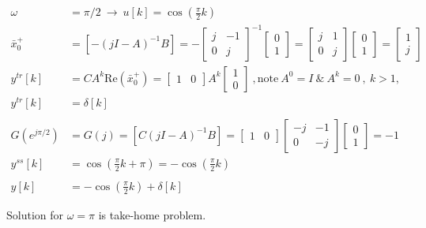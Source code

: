 \documentclass[twoside]{article}
\begin{document}
\begin{align*} 
	\omega &= \pi/2 \ \rightarrow \ u[k] = \cos \left( \frac{\pi}{2} k \right)
	\\
 	\bar{x}_0^+ &= \left[ - (j I - A)^{-1} B \right] = - \begin{bmatrix} j & -1 \\ 0 & j \end{bmatrix}^{-1} \begin{bmatrix} 0 \\ 1 \end{bmatrix} = 
	 \begin{bmatrix} j & 1 \\ 0 & j \end{bmatrix} \begin{bmatrix} 0 \\ 1 \end{bmatrix} = \begin{bmatrix} 1 \\ j \end{bmatrix} 
	 \\
	 y^{tr}[k] &= C A^k \mathrm{Re} \left( \bar{x}_0^+ \right) = \begin{bmatrix} 1 & 0 \end{bmatrix} A^k \begin{bmatrix} 1 \\ 0 \end{bmatrix} \ ,  \mathrm{note} \  A^0 = I \ \& \ A^k = 0 \ , \ k > 1 ,
	 \\
	 y^{tr}[k] &= \delta[k]
	 \\
	 \\
	 G(e^{j \pi/2 }) &= G(j) = \left[ C (j I - A)^{-1} B \right] = \begin{bmatrix} 1 & 0 \end{bmatrix} \begin{bmatrix} -j & -1 \\ 0 & -j \end{bmatrix} \begin{bmatrix} 0 \\ 1 \end{bmatrix} = -1
	 \\
	 y^{ss}[k] &= \cos\left( \frac{\pi}{2} k + \pi \right) = - \cos\left( \frac{\pi}{2} k \right)
	 \\
	 \\
	 y[k] &= - \cos\left( \frac{\pi}{2} k \right) + \delta[k]
\end{align*}

Solution for $\omega = \pi$ is take-home problem. 
\end{document}
